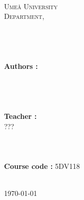 \begin{titlepage}

\begin{center}


~\\
~\\
~\\
\textsc{\LARGE Ume\aa{} University}\\[1cm]

\textsc{\Large {\filiere{} Department, \annee}}\\[0.5cm]

\HRule \\[0.4cm]
{ \LARGE \bfseries \titre \\ \huge \soustitre}\\[0.4cm]

\HRule \\[0.5cm]

\textbf{Authors :}\\
\equipe\\
~\\
~\\
~\\
\textbf{Teacher :}\\
???\\
~\\
~\\
~\\
\textbf{Course code : } 5DV118\\

~\\

\vfill

{\large \today}

\end{center}

\end{titlepage}